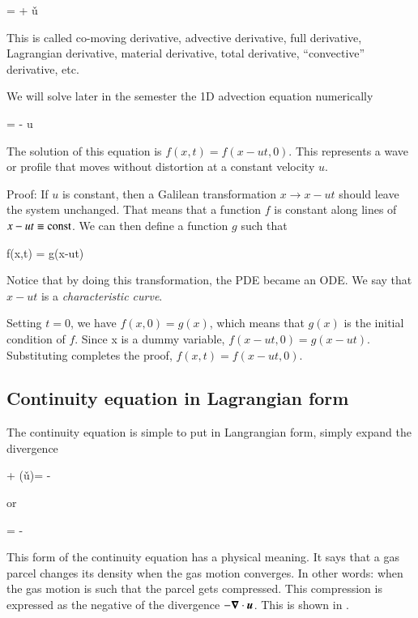 \beq
{} = \ptderiv{} + \v{u}\cdot \grad
\eeq

This is called co-moving derivative, advective derivative, full
derivative, Lagrangian derivative, material derivative, total
derivative, ``convective'' derivative, etc.

We will solve later in the semester the 1D advection equation numerically

\beq
{} = - u 
\eeq

The solution of this equation is $f(x,t) = f(x-ut,0)$. This represents
a wave or profile that moves without distortion at a constant velocity
$u$. 

Proof: If $u$ is constant, then a Galilean transformation $x\rightarrow x-ut$ should
leave the system unchanged. That means that a function $f$ is constant
along lines of $x-ut\equiv{\rm const}$. We can then define a function
$g$ such that 

\beq
f(x,t) = g(x-ut)
\label{eq:fxt}
\eeq

Notice that by doing this transformation, the PDE became an ODE. We
say that $x-ut$ is a  {\it characteristic curve}.

Setting $t=0$, we have $f(x,0) = g(x)$, which means that $g(x)$ is the
initial condition of $f$. Since x is a dummy variable, $f(x-ut,0) =
g(x-ut)$. Substituting  completes the proof, $f(x,t)=f(x-ut,0)$.


\subsection{Continuity equation in Lagrangian form}

The continuity equation is simple to put in Langrangian form, simply
expand the divergence 

\beq
  \ptderiv{\rho} + \left(\v{u}\cdot \grad\right)\rho= - \rho {}
\eeq

\noindent or 

\beq
   = - \rho {}
\eeq

This form of the continuity equation has a physical meaning. It says that a gas parcel changes
its density when the gas motion converges. In other words: when the gas motion is such that the
parcel gets compressed. This compression is expressed as the negative
of the divergence $-{\boldsymbol{\nabla}}\cdot{{\boldsymbol{u}}}$. This is shown in .

